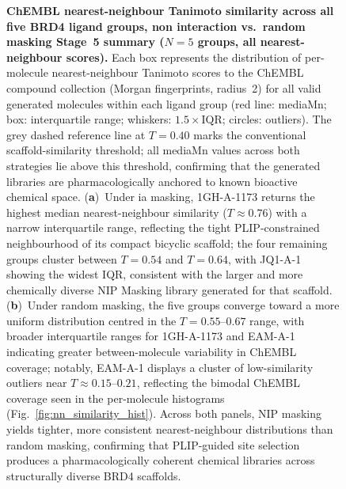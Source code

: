 \documentclass[a4paper,12pt]{article}
\begin{document}
\begin{figure}[htbp]
    \caption{%
        \textbf{ChEMBL nearest-neighbour Tanimoto similarity across all
        five BRD4 ligand groups,  non interaction vs.\ random
        masking   Stage~5 summary ($N = 5$ groups, all nearest-neighbour
        scores).}
        Each box represents the distribution of per-molecule nearest-neighbour
        Tanimoto scores to the ChEMBL compound collection (Morgan fingerprints,
        radius~2) for all valid generated molecules within each ligand group
        (red line: mediaMn; box: interquartile range; whiskers:
        $1.5\times\mathrm{IQR}$; circles: outliers).
        The grey dashed reference line at $T = 0.40$ marks the conventional
        scaffold-similarity threshold; all mediaMn values across both strategies
        lie above this threshold, confirming that the generated libraries are
        pharmacologically anchored to known bioactive chemical space.
        (\textbf{a})~Under ia masking, 1GH-A-1173 returns the highest median
        nearest-neighbour similarity ($T \approx 0.76$) with a narrow
        interquartile range, reflecting the tight PLIP-constrained neighbourhood
        of its compact bicyclic scaffold; the four remaining groups cluster
        between $T = 0.54$ and $T = 0.64$, with JQ1-A-1 showing the widest
        IQR, consistent with the larger and more chemically diverse NIP Masking library
        generated for that scaffold.
        (\textbf{b})~Under random masking, the five groups converge toward a
        more uniform distribution centred in the $T = 0.55$--$0.67$ range,
        with broader interquartile ranges for 1GH-A-1173 and EAM-A-1
        indicating greater between-molecule variability in ChEMBL coverage;
        notably, EAM-A-1 displays a cluster of low-similarity outliers near
        $T \approx 0.15$--$0.21$, reflecting the bimodal ChEMBL coverage
        seen in the per-molecule histograms (Fig.~\ref{fig:nn_similarity_hist}).
        Across both panels, NIP masking yields tighter, more consistent
        nearest-neighbour distributions than random masking, confirming that
        PLIP-guided site selection produces a pharmacologically coherent chemical
        libraries across structurally diverse BRD4 scaffolds.
    }
    \label{fig:boxplot_chembl_summary}
\end{figure}

\clearpage
\end{document}

